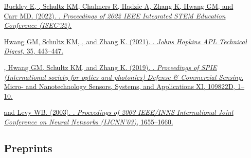 \begin{description}
  \item \href{https://jdmonaco.com/files/buckley-2022-ISEC-author.pdf} {Buckley
      E, , Schultz KM, Chalmers R, Hadzic A, Zhang K, Hwang GM,
      and Carr MD. (2022). . \emph{Proceedings
    of 2022 IEEE Integrated STEM Education Conference (ISEC'22)}.}
  \item \href{https://www.jhuapl.edu/Content/techdigest/pdf/V35-N04/35-04-Hwang.pdf}
    {Hwang GM, Schultz KM, , and Zhang K. (2021).
      . \emph{Johns Hopkins
    APL Technical Digest}, 35, 443--447.}
  \item \href{https://dx.doi.org/10.1117/12.2518966}
    {, Hwang GM, Schultz KM, and Zhang K. (2019).
      . \emph{Proceedings of SPIE (International society
      for optics and photonics) Defense \& Commercial Sensing}. Micro- and
      Nanotechnology Sensors, Systems, and Applications XI, 109822D, 1--10.
    }
  \item \begin{samepage}\href{https://dx.doi.org/10.1109/IJCNN.2003.1223655}
      { and Levy WB. (2003). . \emph{Proceedings of 2003 IEEE/INNS
        International Joint Conference on Neural Networks (IJCNN'03)}, 1655--1660.
      }
      \end{samepage}
\end{description}

\subsection*{Preprints}
\label{sec:preprints}

